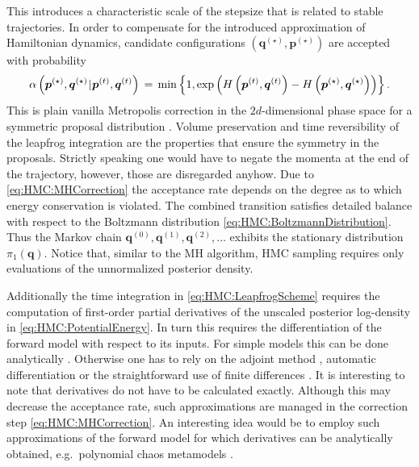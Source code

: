 This introduces a characteristic scale of the stepsize that is related to stable trajectories.
In order to compensate for the introduced approximation of Hamiltonian dynamics, candidate configurations \((\bm{q}^{(\star)},\bm{p}^{(\star)})\) are accepted with probability
\begin{equation} \label{eq:HMC:MHCorrection}
  \alpha \left( \bm{p}^{(\star)}, \bm{q}^{(\star)} {\:\!}|{\:\!} \bm{p}^{(t)}, \bm{q}^{(t)} \right)
  \, = \, \operatorname{min} \left\{ 1,  \exp \left( H \left( \bm{p}^{(t)},\bm{q}^{(t)} \right) - H \left( \bm{p}^{(\star)},\bm{q}^{(\star)} \right) \right) \right\}.
\end{equation}
This is plain vanilla Metropolis correction in the \(2d\)-dimensional phase space for a symmetric proposal distribution \cite{MCMC:SanzSerna2014}.
Volume preservation and time reversibility of the leapfrog integration are the properties that ensure the symmetry in the proposals.
Strictly speaking one would have to negate the momenta at the end of the trajectory, however, those are disregarded anyhow.
Due to \cref{eq:HMC:MHCorrection} the acceptance rate depends on the degree as to which energy conservation is violated.
The combined transition satisfies detailed balance with respect to the Boltzmann distribution \cref{eq:HMC:BoltzmannDistribution}.
Thus the Markov chain \(\bm{q}^{(0)},\bm{q}^{(1)},\bm{q}^{(2)},\ldots\) exhibits the stationary distribution \(\pi_1(\bm{q})\).
Notice that, similar to the MH algorithm, HMC sampling requires only evaluations of the unnormalized posterior density.
\par %
Additionally the time integration in \cref{eq:HMC:LeapfrogScheme} requires the computation of first-order partial derivatives of the unscaled posterior log-density in \cref{eq:HMC:PotentialEnergy}.
In turn this requires the differentiation of the forward model with respect to its inputs.
For simple models this can be done analytically \cite{Nagel:ICVRAM2014:Proc}.
Otherwise one has to rely on the adjoint method \cite{MCMC:BuiThanh2014}, automatic differentiation \cite{MCMC:Cheung2009} or the straightforward use of finite differences \cite{MCMC:Boulkaibet2015}.
It is interesting to note that derivatives do not have to be calculated exactly.
Although this may decrease the acceptance rate, such approximations are managed in the correction step \cref{eq:HMC:MHCorrection}.
An interesting idea would be to employ such approximations of the forward model for which derivatives can be analytically obtained, e.g.\ polynomial chaos metamodels \cite{PCE:Sudret2015}.
